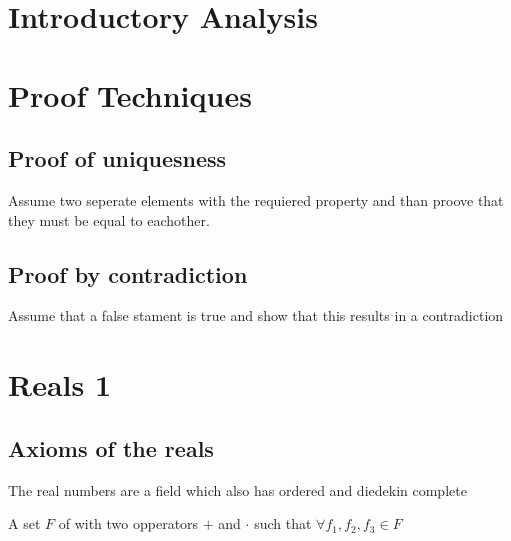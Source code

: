 \documentclass{tufte-book}
\providecommand{\tightlist}{%
  \setlength{\itemsep}{0pt}\setlength{\parskip}{0pt}}
\begin{document}
\hypertarget{introductory-analysis}{%
\section{Introductory Analysis}\label{introductory-analysis}}\hypertarget{proof-techniques}{%
\section{Proof Techniques}\label{proof-techniques}}

\hypertarget{proof-of-uniquesness}{%
\subsection{Proof of uniquesness}\label{proof-of-uniquesness}}

Assume two seperate elements with the requiered property and than proove
that they must be equal to eachother.

\hypertarget{proof-by-contradiction}{%
\subsection{Proof by contradiction}\label{proof-by-contradiction}}

Assume that a false stament is true and show that this results in a
contradiction\hypertarget{reals-1}{%
\section{Reals 1}\label{reals-1}}\hypertarget{axioms-of-the-reals}{%
\subsection{Axioms of the reals}\label{axioms-of-the-reals}}

The real numbers are a field which also has ordered and diedekin
complete

\begin{description}
\tightlist
\item[Field]
A set \(F\) of with two opperators \(+\) and \(\cdot\) such that
\(\forall f_1, f_2, f_3 \in F\)
\end{description}
\end{document}
